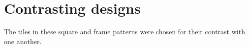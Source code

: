 \documentclass{tufte-book}
\begin{document}
\section{Contrasting designs}
The tiles in these square and frame patterns were chosen for their contrast with one another.
{
\setlength{\tabcolsep}{0pt}
\renewcommand{\arraystretch}{0}

}
\backmatter
\nocite{*}


\end{document}
